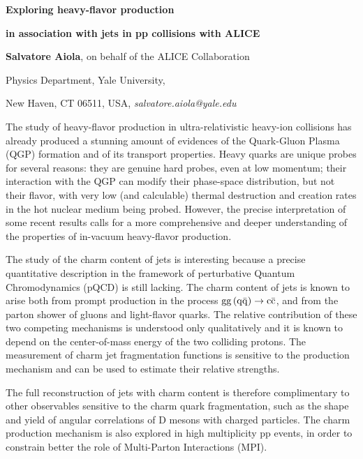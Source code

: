 \documentclass[12pt]{article}
\begin{document}
\centerline{\bf 
Exploring heavy-flavor production 
}

\centerline{\bf 
in association with jets in pp collisions with ALICE
}

\vspace{12pt}

\centerline{ {\bf Salvatore Aiola}, on behalf of the ALICE Collaboration }

\vspace{12pt}

\centerline{Physics Department, Yale University,
}\centerline{New Haven, CT 06511, USA, {\it salvatore.aiola@yale.edu}}

\vspace{12pt}


\vspace{12pt} \vspace{12pt}
The study of heavy-flavor production in ultra-relativistic heavy-ion collisions has already produced
a stunning amount of evidences of the Quark-Gluon Plasma (QGP) formation and of its transport properties. 
Heavy quarks are unique probes for several reasons: they are genuine hard probes, even at low momentum;
their interaction with the QGP can modify their phase-space distribution, but not their flavor, with very low
(and calculable) thermal destruction and creation rates in the hot nuclear medium being probed.
However, the precise interpretation of some recent results calls for a more comprehensive and deeper understanding
of the properties of in-vacuum heavy-flavor production.

The study of the charm content of jets is interesting because 
a precise quantitative description in the framework of perturbative
Quantum Chromodynamics (pQCD) is still lacking.
The charm content of jets is known to arise both from prompt production in the process ${\rm gg\, (q\bar{q})} \rightarrow {\rm c\bar{c}}$, and
from the parton shower of gluons and light-flavor quarks.
The relative contribution of these two competing mechanisms is understood only qualitatively
and it is known to depend on the center-of-mass energy of the two colliding protons.
The measurement of charm jet fragmentation functions is sensitive to the production mechanism and 
can be used to estimate their relative strengths.

The full reconstruction of jets with charm content is therefore complimentary to other observables sensitive to the charm quark fragmentation, 
such as the shape and yield of angular correlations of D mesons with
charged particles. The charm production mechanism is also explored in high multiplicity pp events,
in order to constrain better the role of Multi-Parton Interactions (MPI).
\end{document}
